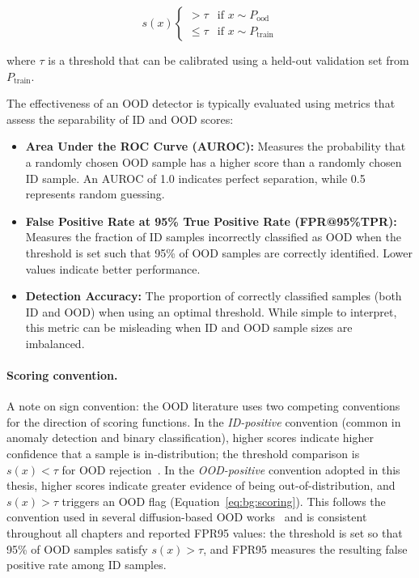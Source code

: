 \begin{equation}
\label{eq:bg:scoring}
s(x) \begin{cases}
> \tau & \text{if } x \sim P_{\text{ood}} \\
\leq \tau & \text{if } x \sim P_{\text{train}}
\end{cases}
\end{equation}

where $\tau$ is a threshold that can be calibrated using a held-out validation set from $P_{\text{train}}$.

The effectiveness of an OOD detector is typically evaluated using metrics that assess the separability of ID and OOD scores:

\begin{itemize}
    \item \textbf{Area Under the ROC Curve (AUROC):} Measures the probability that a randomly chosen OOD sample has a higher score than a randomly chosen ID sample. An AUROC of 1.0 indicates perfect separation, while 0.5 represents random guessing.
    \item \textbf{False Positive Rate at 95\% True Positive Rate (FPR@95\%TPR):} Measures the fraction of ID samples incorrectly classified as OOD when the threshold is set such that 95\% of OOD samples are correctly identified. Lower values indicate better performance.
    \item \textbf{Detection Accuracy:} The proportion of correctly classified samples (both ID and OOD) when using an optimal threshold. While simple to interpret, this metric can be misleading when ID and OOD sample sizes are imbalanced.
\end{itemize}

\paragraph{Scoring convention.}
A note on sign convention: the OOD literature uses two competing conventions for the direction of scoring functions. In the \emph{ID-positive} convention (common in anomaly detection and binary classification), higher scores indicate higher confidence that a sample is in-distribution; the threshold comparison is $s(x) < \tau$ for OOD rejection~\cite{liu2020energy}. In the \emph{OOD-positive} convention adopted in this thesis, higher scores indicate greater evidence of being out-of-distribution, and $s(x) > \tau$ triggers an OOD flag (Equation~\ref{eq:bg:scoring}).
This follows the convention used in several diffusion-based OOD works~\cite{liu2025survey, heng2024outofdistribution} and is consistent throughout all chapters and reported FPR95 values: the threshold is set so that 95\% of OOD samples satisfy $s(x) > \tau$, and FPR95 measures the resulting false positive rate among ID samples.

